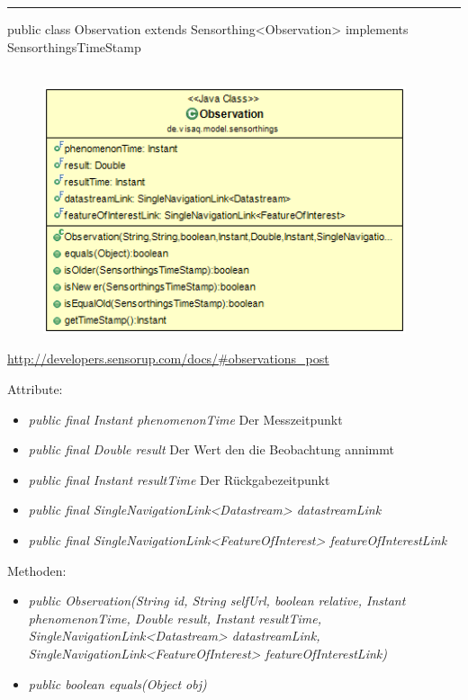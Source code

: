 \rule{\textwidth}{0.4pt}
public class Observation extends Sensorthing<Observation> implements SensorthingsTimeStamp
\\\\
\begin{minipage}{0.4\textwidth}
    \begin{figure}[H]
        {\centering\includegraphics[width=0.95\textwidth]{media/backend/modell/classes/Observation.png}}
    \end{figure}
    \end{minipage} \hfill
\begin{minipage}{0.6\textwidth}
    \url{http://developers.sensorup.com/docs/#observations_post}
\end{minipage}

Attribute:
\begin{itemize}
    \item \emph{public final Instant phenomenonTime} Der Messzeitpunkt
    \item \emph{public final Double result} Der Wert den die Beobachtung annimmt
    \item \emph{public final Instant resultTime} Der Rückgabezeitpunkt
    \item \emph{public final SingleNavigationLink<Datastream> datastreamLink} 
    \item \emph{public final SingleNavigationLink<FeatureOfInterest> featureOfInterestLink} 
\end{itemize}
Methoden:
\begin{itemize}
    \item \emph{public Observation(String id, String selfUrl, boolean relative, Instant phenomenonTime, Double result, Instant resultTime, SingleNavigationLink<Datastream> datastreamLink, SingleNavigationLink<FeatureOfInterest> featureOfInterestLink)}
    \item \emph{public boolean equals(Object obj)} 
\end{itemize}

